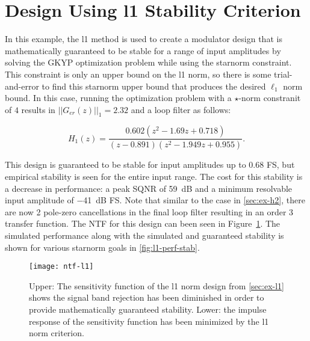 \section{Design Using \gls{l1} Stability Criterion}
\label{sec:ex-l1}

In this example, the \gls{l1} method is used to create a modulator design that is mathematically guaranteed to be stable for a range of input amplitudes by solving the \gls{GKYP} optimization problem while using the \gls{starnorm} constraint. This constraint is only an upper bound on the \gls{l1} norm, so there is some trial-and-error to find this \gls{starnorm} upper bound that produces the desired $\ell_1$ norm bound. In this case, running the optimization problem with a $\star$-norm constranit of $4$ results in $||G_{er}(z)||_1 = 2.32$ and a loop filter as follows:

\begin{equation*}
	H_1(z) = \frac{0.602\left(z^2 - 1.69z + 0.718\right)}{\left(z - 0.891\right)\left(z^2 - 1.949z + 0.955\right)}.
\end{equation*}

This design is guaranteed to be stable for input amplitudes up to 0.68 \gls{FS}, but empirical stability is seen for the entire input range. The cost for this stability is a decrease in performance: a peak \gls{SQNR} of \SI{59}{\deci\bel} and a minimum resolvable input amplitude of \SI{-41}{\deci\bel} FS. Note that similar to the case in \autoref{sec:ex-h2}, there are now 2 pole-zero cancellations in the final loop filter resulting in an order 3 transfer function. The \gls{NTF} for this design can been seen in Figure~\ref{fig:ntf-l1}. The simulated performance along with the simulated and guaranteed stability is shown for various \gls{starnorm} goals in \autoref{fig:l1-perf-stab}.

\begin{figure}
	\centering
	\texttt{[image: ntf-l1]}
	\caption{Upper: The sensitivity function of the \gls{l1} norm design from \autoref{sec:ex-l1} shows the signal band rejection has been diminished in order to provide mathematically guaranteed stability. Lower: the impulse response of the sensitivity function has been minimized by the \gls{l1} norm criterion.} \label{fig:ntf-l1}
\end{figure}

